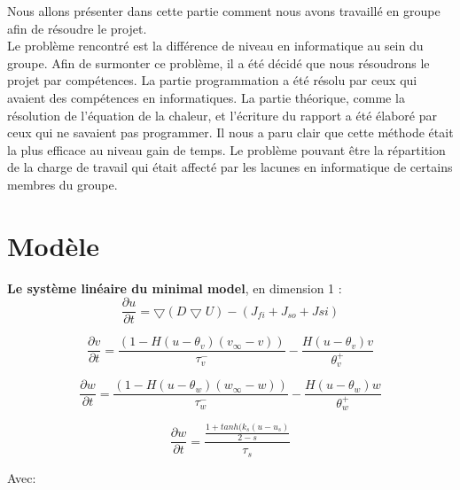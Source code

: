 \documentclass[a4paper,12pt,twoside]{report}
\begin{document}
Nous allons présenter dans cette partie comment nous avons travaillé en groupe afin de résoudre le projet.\\ 
\hspace*{1cm} Le problème rencontré est la différence de niveau en informatique au sein du groupe. Afin de surmonter ce problème, il a été décidé que nous résoudrons le projet par compétences. La partie programmation a été résolu par ceux qui avaient des compétences en informatiques. La partie théorique, comme la résolution de l'équation de la chaleur, et l'écriture du rapport a été élaboré par ceux qui ne savaient pas programmer. Il nous a paru clair que cette méthode était la plus efficace au niveau gain de temps. Le problème pouvant être la répartition de la charge de travail qui était affecté par les lacunes en informatique de certains membres du groupe.\\
















\section{Modèle}
\textbf{Le système linéaire du minimal model}, en dimension 1 :\\

\begin{equation}
\frac{\partial u}{\partial t}=\bigtriangledown( D \bigtriangledown U )-(J_{fi}+J_{so}+	J{si})
\end{equation}

\begin{equation}
\frac{\partial v}{\partial t}=\frac{(1-H(u-\theta_v)(v_\infty -v))}{\tau_v^-}-\frac{H(u-\theta_v)v}{\theta_v^+}
\end{equation}


\begin{equation}
\frac{\partial w}{\partial t}=\frac{(1-H(u-\theta_w)(w_\infty -w))}{\tau_w^-}-\frac{H(u-\theta_w)w}{\theta_w^+}
\end{equation}


\begin{equation}
\frac{\partial w}{\partial t}=\frac{\frac{1+tanh(k_s(u-u_s)}{2-s}}{\tau_s}
\end{equation}


Avec:
\end{document}
